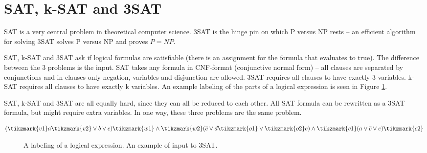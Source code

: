 \documentclass[msc,lith,english]{liuthesis}
\begin{document}
\section{SAT, k-SAT and 3SAT}\label{secSAT}
SAT is a very central problem in theoretical computer science. 3SAT is the
hinge pin on which P versus NP rests -- an efficient algorithm for solving 3SAT
solves P versus NP and proves $P = NP$.

SAT, k-SAT and 3SAT ask if logical formulas are satisfiable (there is an assignment for the formula that evaluates to true).
The difference between the 3 problems is the input. SAT takes any formula in
CNF-format (conjunctive normal form) -- all clauses are separated by conjunctions and
in clauses only negation, variables and disjunction are allowed.
3SAT requires all clauses to have exactly 3 variables.
k-SAT requires all clauses to have exactly k variables.
An example labeling of the  parts of a logical expression is seen in Figure \ref{figExSAT}. 

SAT, k-SAT and 3SAT are all equally hard, since they can all be reduced to each
other. All SAT formula can be rewritten as a 3SAT formula, but might require
extra variables. In one way, these three problems are the same problem.

$$
  (\tikzmark{v1}a\tikzmark{v2} \vee b \vee c) \tikzmark{w1}\wedge\tikzmark{w2} (\overline{c} \vee d \tikzmark{o1}\vee\tikzmark{o2} e) \wedge \tikzmark{c1}(a \vee \overline{c} \vee e)\tikzmark{c2}
$$
\begin{figure}[h!]
  \caption{A labeling of a logical expression. An example of input to 3SAT.}
  \label{figExSAT}
\end{figure}
\end{document}

